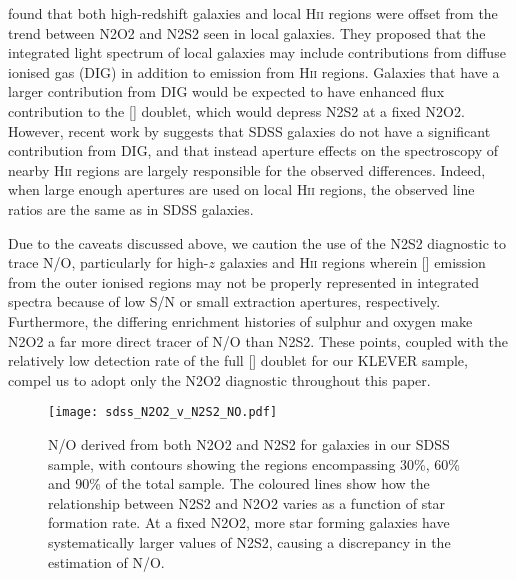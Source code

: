 \documentclass[usenatbib]{mnras} %
\begin{document}
\cite{Strom_2018} found that both high-redshift galaxies and local \textsc{Hii} regions were offset from the trend between N2O2 and N2S2 seen in local galaxies. They proposed that the integrated light spectrum of local galaxies may include contributions from diffuse ionised gas (DIG) in addition to emission from \textsc{Hii} regions. Galaxies that have a larger contribution from DIG would be expected to have enhanced flux contribution to the [] doublet, which would depress N2S2 at a fixed N2O2. However, recent work by \cite{Mannucci_2021} suggests that SDSS galaxies do not have a significant contribution from DIG, and that instead aperture effects on the spectroscopy of nearby \textsc{Hii} regions are largely responsible for the observed differences. Indeed, when large enough apertures are used on local \textsc{Hii} regions, the observed line ratios are the same as in SDSS galaxies.

Due to the caveats discussed above, we caution the use of the N2S2 diagnostic to trace N/O, particularly for high-$z$ galaxies and \textsc{Hii} regions wherein [] emission from the outer ionised regions may not be properly represented in integrated spectra because of low S/N or small extraction apertures, respectively. Furthermore, the differing enrichment histories of sulphur and oxygen make N2O2 a far more direct tracer of N/O than N2S2. These points, coupled with the relatively low detection rate of the full [] doublet for our KLEVER sample, compel us to adopt only the N2O2 diagnostic throughout this paper.



\begin{figure}
    \centering
    \texttt{[image: sdss\_N2O2\_v\_N2S2\_NO.pdf]} \par
    \caption{N/O derived from both N2O2 and N2S2 for galaxies in our SDSS sample, with contours showing the regions encompassing 30\%, 60\% and 90\% of the total sample. The coloured lines show how the relationship between N2S2 and N2O2 varies as a function of star formation rate. At a fixed N2O2, more star forming galaxies have systematically larger values of N2S2, causing a discrepancy in the estimation of N/O.}
    \label{fig:N2O2vN2S2}
\end{figure}
\end{document}
